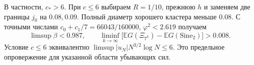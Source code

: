 \documentclass[11pt,a4paper]{article}
\newcommand{\EE}{\mathbb E}
\newcommand{\si}{\mathrm{Sine}_2}
\begin{document}
В частности, \(c_*>6\). При \(c\le6\) выбираем \(R=1/10\), прежнюю \(h\) и заменяем две границы \(j_0\) на \(0.08,0.09\). Полный диаметр хорошего кластера меньше \(0.08\). С точными числами \(c_0+c_1/7=66043/160000\), \(\varphi^2<2.619\) получаем
\[
 \limsup\beta<0.987,\qquad
 \liminf_{k\to\infty}\bigl[\EE G(\Xi_{7^k})-\EE G(\si)\bigr]>0.008 .
\]
Условие \(c\le6\) эквивалентно \(\limsup |u_N|N^{3/2}\log N\le6\). Это предельное опровержение для указанной области убывающих сил.
\end{document}

